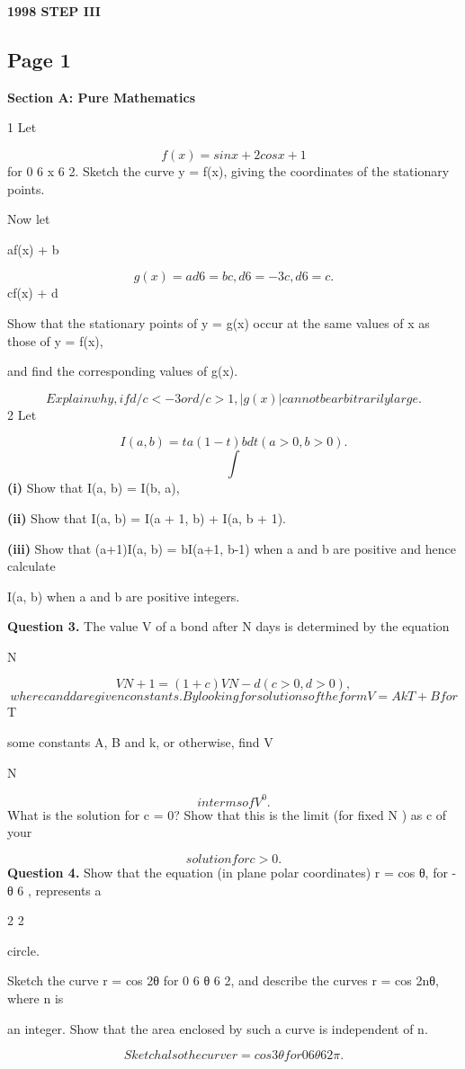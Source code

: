 \documentclass[12pt]{article}
\begin{document}
\begin{center}
{\Large \textbf{1998 STEP III}}
\end{center}

\subsection*{Page 1}
\begin{flushleft}
\bigskip\textbf{Section A: Pure Mathematics}\par
1 Let\par
\[f(x) = sin x + 2 cos x + 1\]
for 0 6 x 6 2\pi. Sketch the curve y = f(x), giving the coordinates of the stationary points.\par
Now let\par
af(x) + b\par
\[g(x) = ad 6= bc , d 6= -3c , d 6= c .\]
cf(x) + d\par
Show that the stationary points of y = g(x) occur at the same values of x as those of y = f(x),\par
and find the corresponding values of g(x).\par
\[Explain why, if d/c < -3 or d/c > 1, |g(x)| cannot be arbitrarily large.\]
2 Let\par
\[I(a, b) = ta(1 - t)b dt (a > 0, b > 0).\]
\[\int\]
\textbf{(i)} Show that I(a, b) = I(b, a),\par
\textbf{(ii)} Show that I(a, b) = I(a + 1, b) + I(a, b + 1).\par
\textbf{(iii)} Show that (a+1)I(a, b) = bI(a+1, b-1) when a and b are positive and hence calculate\par
I(a, b) when a and b are positive integers.\par
\bigskip\textbf{Question 3.} The value V of a bond after N days is determined by the equation\par
N\par
\[V N+1 = (1 + c)V N - d (c > 0, d > 0),\]
\[where c and d are given constants. By looking for solutions of the form V = AkT + B for\]
T\par
some constants A, B and k, or otherwise, find V\par
N\par
\[in terms of V^0.\]
What is the solution for c = 0? Show that this is the limit (for fixed N ) as c  of your\par
\[solution for c > 0.\]
\bigskip\textbf{Question 4.} Show that the equation (in plane polar coordinates) r = cos θ, for -  θ 6 \pi , represents a\par
2 2\par
circle.\par
Sketch the curve r = cos 2θ for 0 6 θ 6 2\pi, and describe the curves r = cos 2nθ, where n is\par
an integer. Show that the area enclosed by such a curve is independent of n.\par
\[Sketch also the curve r = cos 3θ for 0 6 θ 6 2\pi.\]
\end{flushleft}
\end{document}
